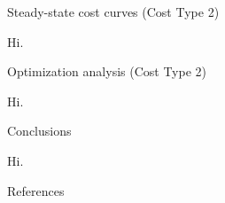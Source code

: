 \documentclass[xcolor=dvipsnames, 8pt]{beamer} %
\begin{document}
\begin{frame}{Steady-state cost curves (Cost Type 2)}

	Hi.

\end{frame}

\begin{frame}{Optimization analysis (Cost Type 2)}

	Hi.

\end{frame}

\begin{frame}{Conclusions}

	Hi.

\end{frame}

\begin{frame}{References}


\end{frame}
\end{document}
